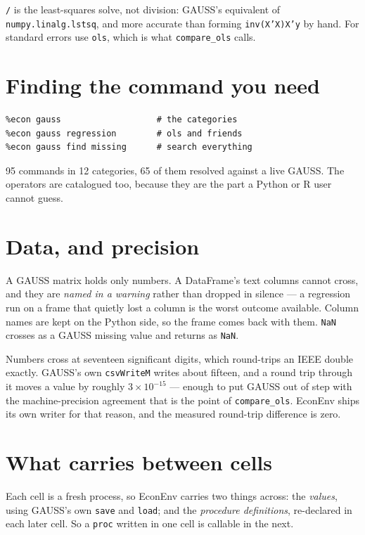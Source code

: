 \documentclass[11pt,a4paper]{report}
\begin{document}
\texttt{/} is the least-squares solve, not division: GAUSS's equivalent of
\texttt{numpy.linalg.lstsq}, and more accurate than forming
\texttt{inv(X'X)X'y} by hand. For standard errors use \texttt{ols}, which is
what \texttt{compare\_ols} calls.

\section{Finding the command you need}

\begin{lstlisting}
%econ gauss                   # the categories
%econ gauss regression        # ols and friends
%econ gauss find missing      # search everything
\end{lstlisting}

95 commands in 12 categories, 65 of them resolved against a live GAUSS. The
operators are catalogued too, because they are the part a Python or R user
cannot guess.

\section{Data, and precision}

A GAUSS matrix holds only numbers. A DataFrame's text columns cannot cross, and
they are \emph{named in a warning} rather than dropped in silence --- a
regression run on a frame that quietly lost a column is the worst outcome
available. Column names are kept on the Python side, so the frame comes back
with them. \texttt{NaN} crosses as a GAUSS missing value and returns as
\texttt{NaN}.

\begin{note}
Numbers cross at seventeen significant digits, which round-trips an IEEE double
exactly. GAUSS's own \texttt{csvWriteM} writes about fifteen, and a round trip
through it moves a value by roughly $3\times10^{-15}$ --- enough to put GAUSS
out of step with the machine-precision agreement that is the point of
\texttt{compare\_ols}. EconEnv ships its own writer for that reason, and the
measured round-trip difference is zero.
\end{note}

\section{What carries between cells}

Each cell is a fresh process, so EconEnv carries two things across: the
\emph{values}, using GAUSS's own \texttt{save} and \texttt{load}; and the
\emph{procedure definitions}, re-declared in each later cell. So a \texttt{proc}
written in one cell is callable in the next.
\end{document}

